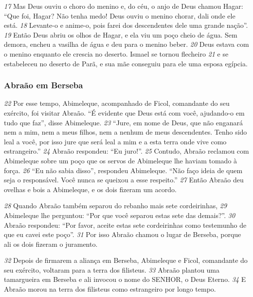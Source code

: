\bigskip   
\textit{\tiny 17}
Mas Deus ouviu o choro do menino e, do céu, o anjo de Deus chamou Hagar:
“Que foi, Hagar? Não tenha medo! Deus ouviu o menino chorar, dali onde ele está.
\textit{\tiny 18}
Levante-o e anime-o, pois farei dos descendentes dele uma grande nação”.
\textit{\tiny 19}
Então Deus abriu os olhos de Hagar, e ela viu um poço cheio de água. Sem
demora, encheu a vasilha de água e deu para o menino beber.
\textit{\tiny 20}
Deus estava com o menino enquanto ele crescia no deserto. Ismael se tornou
flecheiro 
\textit{\tiny 21}
e se estabeleceu no deserto de Parã, e sua mãe conseguiu para ele uma
esposa egípcia.

\bigskip   
\subsubsection*{Abraão em Berseba}
\textit{\tiny 22}
Por esse tempo, Abimeleque, acompanhado de Ficol, comandante do seu
exército, foi visitar Abraão. “É evidente que Deus está com você, ajudando-o em
tudo que faz”, disse Abimeleque. 
\textit{\tiny 23}
“Jure, em nome de Deus, que não enganará
nem a mim, nem a meus filhos, nem a nenhum de meus descendentes. Tenho
sido leal a você, por isso jure que será leal a mim e a esta terra onde vive como
estrangeiro.”
\textit{\tiny 24}
Abraão respondeu: “Eu juro!”. 
\textit{\tiny 25}
Contudo, Abraão reclamou com Abimeleque
sobre um poço que os servos de Abimeleque lhe haviam tomado à força.
\textit{\tiny 26}
“Eu não sabia disso”, respondeu Abimeleque. “Não faço ideia de quem seja o
responsável. Você nunca se queixou a esse respeito.”
\textit{\tiny 27}
Então Abraão deu ovelhas e bois a Abimeleque, e os dois fizeram um acordo.

\bigskip   
\textit{\tiny 28}
Quando Abraão também separou do rebanho mais sete cordeirinhas,
\textit{\tiny 29}
Abimeleque lhe perguntou: “Por que você separou estas sete das demais?”.
\textit{\tiny 30}
Abraão respondeu: “Por favor, aceite estas sete cordeirinhas como
testemunho de que eu cavei este poço”. 
\textit{\tiny 31}
Por isso Abraão chamou o lugar de
Berseba, porque ali os dois fizeram o juramento.

\bigskip   
\textit{\tiny 32}
Depois de firmarem a aliança em Berseba, Abimeleque e Ficol, comandante
do seu exército, voltaram para a terra dos filisteus. 
\textit{\tiny 33}
Abraão plantou uma
tamargueira em Berseba e ali invocou o nome do SENHOR, o Deus Eterno.
\textit{\tiny 34}
E
Abraão morou na terra dos filisteus como estrangeiro por longo tempo.

